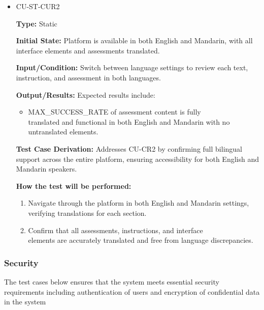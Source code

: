 \documentclass[12pt, titlepage]{article}
\begin{document}
\begin{itemize}
  \item CU-ST-CUR2
  \begin{mdframed}[linewidth=0.5mm] 
    \textbf{Type:} Static \par 
    \textbf{Initial State:} Platform is available in both English and Mandarin, with all interface elements and assessments translated. \par 
    \textbf{Input/Condition:} Switch between language settings to review each text,\\
    instruction, and assessment in both languages. \par 
    \textbf{Output/Results:} Expected results include: 
    \begin{itemize} 
      \item MAX\_SUCCESS\_RATE of assessment content is fully \\translated and functional in both English and Mandarin with no \\untranslated elements. 
    \end{itemize} \par 
    \textbf{Test Case Derivation:} Addresses CU-CR2 by confirming full bilingual support across the entire platform, ensuring accessibility for both English and Mandarin speakers. \par 
    \textbf{How the test will be performed:} 
    \begin{enumerate}[noitemsep] 
      \item Navigate through the platform in both English and Mandarin settings, \\ verifying translations for each section. 
      \item Confirm that all assessments, instructions, and interface \\elements are accurately translated and free from language discrepancies. 
    \end{enumerate} 
  \end{mdframed} 
\end{itemize}

\subsubsection{Security}

The test cases below ensures that the system meets essential 
security requirements including authentication of users and encryption of 
confidential data in the system
		
\end{document}

